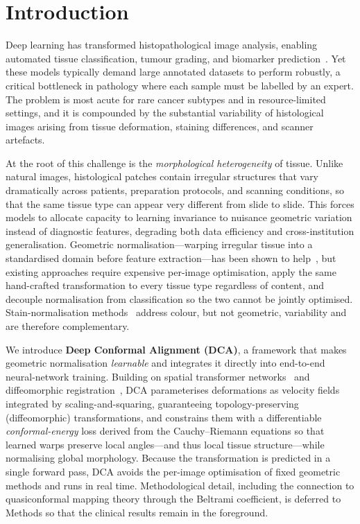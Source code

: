 \section{Introduction}
\label{sec:introduction}

Deep learning has transformed histopathological image analysis, enabling
automated tissue classification, tumour grading, and biomarker
prediction~\cite{huang2024surface,kuntz2021gastrointestinal,chaunzwa2021deep,hirra2021breast,wetstein2022deep}.
Yet these models typically demand large annotated datasets to perform robustly,
a critical bottleneck in pathology where each sample must be labelled by an
expert. The problem is most acute for rare cancer subtypes and in
resource-limited settings, and it is compounded by the substantial variability of
histological images arising from tissue deformation, staining differences, and
scanner artefacts.

At the root of this challenge is the \textit{morphological heterogeneity} of
tissue. Unlike natural images, histological patches contain irregular structures
that vary dramatically across patients, preparation protocols, and scanning
conditions, so that the same tissue type can appear very different from slide to
slide. This forces models to allocate capacity to learning invariance to
nuisance geometric variation instead of diagnostic features, degrading both data
efficiency and cross-institution generalisation. Geometric normalisation---warping
irregular tissue into a standardised domain before feature extraction---has been
shown to help~\cite{huang2024surface}, but existing approaches require expensive
per-image optimisation, apply the same hand-crafted transformation to every
tissue type regardless of content, and decouple normalisation from classification
so the two cannot be jointly optimised. Stain-normalisation
methods~\cite{macenko2009method,shaban2019staingan} address colour, but not
geometric, variability and are therefore complementary.

We introduce \textbf{Deep Conformal Alignment (DCA)}, a framework that makes
geometric normalisation \textit{learnable} and integrates it directly into
end-to-end neural-network training. Building on spatial transformer
networks~\cite{jaderberg2015spatial} and diffeomorphic
registration~\cite{balakrishnan2019voxelmorph}, DCA parameterises deformations as
velocity fields integrated by scaling-and-squaring, guaranteeing
topology-preserving (diffeomorphic) transformations, and constrains them with a
differentiable \textit{conformal-energy} loss derived from the Cauchy--Riemann
equations so that learned warps preserve local angles---and thus local tissue
structure---while normalising global morphology. Because the transformation is
predicted in a single forward pass, DCA avoids the per-image optimisation of fixed
geometric methods and runs in real time. Methodological detail, including the
connection to quasiconformal mapping theory through the Beltrami coefficient, is
deferred to Methods so that the clinical results remain in the foreground.

